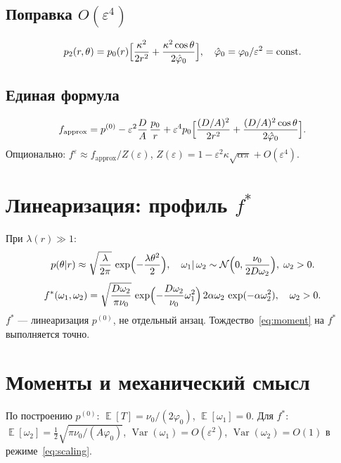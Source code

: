 \documentclass[12pt,a4paper]{article}
\DeclareMathOperator{\E}{\mathbb{E}}
\DeclareMathOperator{\Var}{Var}
\newcommand{\phiz}{\varphi_0}
\newcommand{\nuz}{\nu_0}
\begin{document}
\subsection{Поправка $O(\varepsilon^4)$}

\begin{equation}\label{eq:p2}
  p_2(r,\theta)=p_0(r)\Bigl[\frac{\kappa^2}{2r^2}+\frac{\kappa^2\cos\theta}{2\hat\phiz}\Bigr],
  \quad \hat\phiz=\phiz/\varepsilon^2=\mathrm{const}.
\end{equation}

\subsection{Единая формула}

\begin{equation}\label{eq:unified}
  f_{\mathrm{approx}}=p^{(0)}-\varepsilon^2\frac{D}{A}\,\frac{p_0}{r}
  +\varepsilon^4 p_0\Bigl[\frac{(D/A)^2}{2r^2}+\frac{(D/A)^2\cos\theta}{2\hat\phiz}\Bigr].
\end{equation}
Опционально: $f^\varepsilon\approx f_{\mathrm{approx}}/Z(\varepsilon)$,
$Z(\varepsilon)=1-\varepsilon^2\kappa\sqrt{\alpha\pi}+O(\varepsilon^4)$.

\section{Линеаризация: профиль $f^*$}

При $\lambda(r)\gg1$:
\begin{equation}\label{eq:layer}
  p(\theta|r)\approx\sqrt{\frac{\lambda}{2\pi}}\,\exp\Bigl(-\frac{\lambda\theta^2}{2}\Bigr),\quad
  \omega_1|\,\omega_2\sim\mathcal{N}\Bigl(0,\frac{\nuz}{2D\omega_2}\Bigr),\;\omega_2>0.
\end{equation}
\begin{equation}\label{eq:fstar}
  f^*(\omega_1,\omega_2)=\sqrt{\frac{D\omega_2}{\pi\nuz}}\,
  \exp\Bigl(-\frac{D\omega_2}{\nuz}\omega_1^2\Bigr)\,
  2\alpha\omega_2\,\exp(-\alpha\omega_2^2),\quad \omega_2>0.
\end{equation}
$f^*$ --- линеаризация $p^{(0)}$, не отдельный анзац. Тождество~\eqref{eq:moment} на $f^*$ выполняется точно.

\section{Моменты и механический смысл}

По построению $p^{(0)}$: $\E[T]=\nuz/(2\phiz)$, $\E[\omega_1]=0$.
Для $f^*$: $\E[\omega_2]=\frac{1}{2}\sqrt{\pi\nuz/(A\phiz)}$,
$\Var(\omega_1)=O(\varepsilon^2)$, $\Var(\omega_2)=O(1)$ в режиме~\eqref{eq:scaling}.
\end{document}
